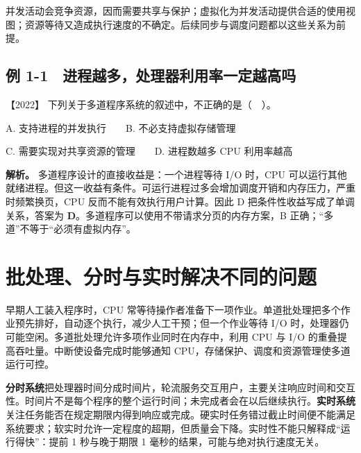 并发活动会竞争资源，因而需要共享与保护；虚拟化为并发活动提供合适的使用视图；资源等待又造成执行速度的不确定。后续同步与调度问题都以这些关系为前提。

\subsection{例 1-1　进程越多，处理器利用率一定越高吗}\label{os-ex1-1}

\noindent{}【2022】 下列关于多道程序系统的叙述中，不正确的是（　）。

A. 支持进程的并发执行　　B. 不必支持虚拟存储管理

C. 需要实现对共享资源的管理　　D. 进程数越多 CPU 利用率越高


\textbf{解析。} 多道程序设计的直接收益是：一个进程等待 I/O 时，CPU 可以运行其他就绪进程。但这一收益有条件。可运行进程过多会增加调度开销和内存压力，严重时频繁换页，CPU 反而不能有效执行用户计算。因此 D 把条件性收益写成了单调关系，答案为 \textbf{D}。多道程序可以使用不带请求分页的内存方案，B 正确；``多道''不等于``必须有虚拟内存''。

\section{批处理、分时与实时解决不同的问题}\label{os-1-2}

早期人工装入程序时，CPU 常等待操作者准备下一项作业。单道批处理把多个作业预先排好，自动逐个执行，减少人工干预；但一个作业等待 I/O 时，处理器仍可能空闲。多道批处理允许多项作业同时在内存中，利用 CPU 与 I/O 的重叠提高吞吐量。中断使设备完成时能够通知 CPU，存储保护、调度和资源管理使多道运行可控。

\textbf{分时系统}把处理器时间分成时间片，轮流服务交互用户，主要关注响应时间和交互性。时间片不是每个程序的整个运行时间；未完成者会在以后继续执行。\textbf{实时系统}关注任务能否在规定期限内得到响应或完成。硬实时任务错过截止时间便不能满足系统要求；软实时允许一定程度的超期，但质量会下降。实时性不能只解释成``运行得快''：提前 1 秒与晚于期限 1 毫秒的结果，可能与绝对执行速度无关。

